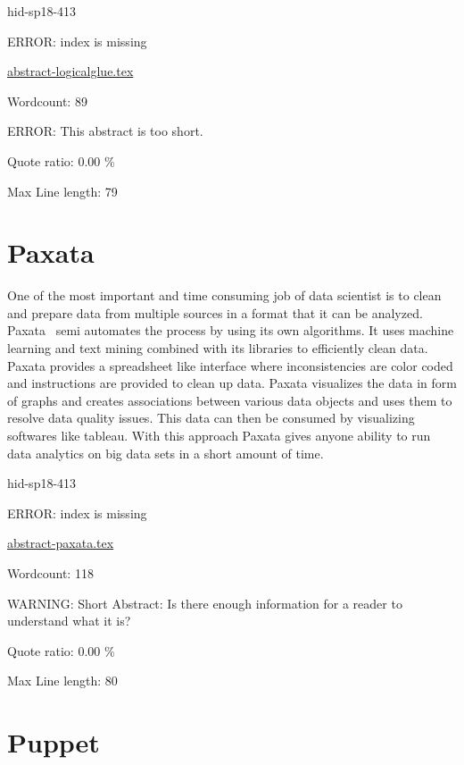 \begin{IU}

hid-sp18-413

ERROR: index is missing

\href{https://github.com/cloudmesh-community/hid-sp18-413/blob/master//technology/abstract-logicalglue.tex}{abstract-logicalglue.tex}

 

Wordcount: 89

ERROR: This abstract is too short.


Quote ratio: 0.00 \%
 
Max Line length: 79
\end{IU}

\section{Paxata}

One of the most important and time consuming job of data scientist is to clean
and prepare data from multiple sources in a format that it can be
analyzed. Paxata~\cite{hid-sp18-413-paxata} semi automates the process by using
its own algorithms. It uses machine learning and text mining combined with its
libraries to efficiently clean data. Paxata provides a spreadsheet like
interface where inconsistencies are color coded and instructions are provided to
clean up data. Paxata visualizes the data in form of graphs and creates
associations between various data objects and uses them to resolve data quality
issues. This data can then be consumed by visualizing softwares like
tableau. With this approach Paxata gives anyone ability to run data analytics on
big data sets in a short amount of time.


\begin{IU}

hid-sp18-413

ERROR: index is missing

\href{https://github.com/cloudmesh-community/hid-sp18-413/blob/master//technology/abstract-paxata.tex}{abstract-paxata.tex}

 

Wordcount: 118

WARNING: Short Abstract: Is there enough information for a reader to understand what it is?


Quote ratio: 0.00 \%
 
Max Line length: 80
\end{IU}

\section{Puppet}

